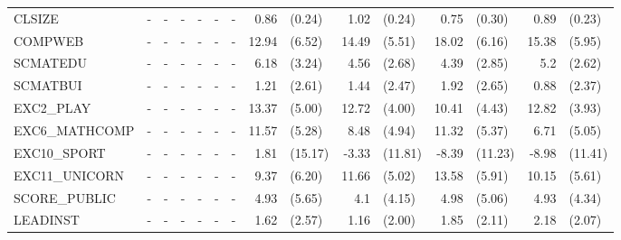 \documentclass[12pt]{article}%
\begin{document}
\begin{table}[H]
\begin{tabular}{lrlrlrlrlrlrlrl}
			CLSIZE & \multicolumn{1}{c}{-} & \multicolumn{1}{c}{-} & \multicolumn{1}{c}{-} & \multicolumn{1}{c}{-} & \multicolumn{1}{c}{-} & \multicolumn{1}{c}{-} & 0.86  & (0.24) & 1.02  & (0.24) & 0.75  & (0.30) & 0.89  & (0.23) \\[0.2em]
			COMPWEB & \multicolumn{1}{c}{-} & \multicolumn{1}{c}{-} & \multicolumn{1}{c}{-} & \multicolumn{1}{c}{-} & \multicolumn{1}{c}{-} & \multicolumn{1}{c}{-} & 12.94 & (6.52) & 14.49 & (5.51) & 18.02 & (6.16) & 15.38 & (5.95) \\[0.2em]
			SCMATEDU & \multicolumn{1}{c}{-} & \multicolumn{1}{c}{-} & \multicolumn{1}{c}{-} & \multicolumn{1}{c}{-} & \multicolumn{1}{c}{-} & \multicolumn{1}{c}{-} & 6.18  & (3.24) & 4.56  & (2.68) & 4.39  & (2.85) & 5.2   & (2.62) \\[0.2em]
			SCMATBUI & \multicolumn{1}{c}{-} & \multicolumn{1}{c}{-} & \multicolumn{1}{c}{-} & \multicolumn{1}{c}{-} & \multicolumn{1}{c}{-} & \multicolumn{1}{c}{-} & 1.21  & (2.61) & 1.44  & (2.47) & 1.92  & (2.65) & 0.88  & (2.37) \\[0.2em]
			EXC2\_PLAY & \multicolumn{1}{c}{-} & \multicolumn{1}{c}{-} & \multicolumn{1}{c}{-} & \multicolumn{1}{c}{-} & \multicolumn{1}{c}{-} & \multicolumn{1}{c}{-} & 13.37 & (5.00) & 12.72 & (4.00) & 10.41 & (4.43) & 12.82 & (3.93) \\[0.2em]
			EXC6\_MATHCOMP & \multicolumn{1}{c}{-} & \multicolumn{1}{c}{-} & \multicolumn{1}{c}{-} & \multicolumn{1}{c}{-} & \multicolumn{1}{c}{-} & \multicolumn{1}{c}{-} & 11.57 & (5.28) & 8.48  & (4.94) & 11.32 & (5.37) & 6.71  & (5.05) \\[0.2em]
			EXC10\_SPORT & \multicolumn{1}{c}{-} & \multicolumn{1}{c}{-} & \multicolumn{1}{c}{-} & \multicolumn{1}{c}{-} & \multicolumn{1}{c}{-} & \multicolumn{1}{c}{-} & 1.81  & (15.17) & -3.33 & (11.81) & -8.39 & (11.23) & -8.98 & (11.41) \\[0.2em]
			EXC11\_UNICORN & \multicolumn{1}{c}{-} & \multicolumn{1}{c}{-} & \multicolumn{1}{c}{-} & \multicolumn{1}{c}{-} & \multicolumn{1}{c}{-} & \multicolumn{1}{c}{-} & 9.37  & (6.20) & 11.66 & (5.02) & 13.58 & (5.91) & 10.15 & (5.61) \\[0.2em]
			SCORE\_PUBLIC & \multicolumn{1}{c}{-} & \multicolumn{1}{c}{-} & \multicolumn{1}{c}{-} & \multicolumn{1}{c}{-} & \multicolumn{1}{c}{-} & \multicolumn{1}{c}{-} & 4.93  & (5.65) & 4.1   & (4.15) & 4.98  & (5.06) & 4.93  & (4.34) \\[0.2em]
			LEADINST & \multicolumn{1}{c}{-} & \multicolumn{1}{c}{-} & \multicolumn{1}{c}{-} & \multicolumn{1}{c}{-} & \multicolumn{1}{c}{-} & \multicolumn{1}{c}{-} & 1.62  & (2.57) & 1.16  & (2.00) & 1.85  & (2.11) & 2.18  & (2.07) \\[0.2em]

\end{tabular}
\end{table}
\end{document}
